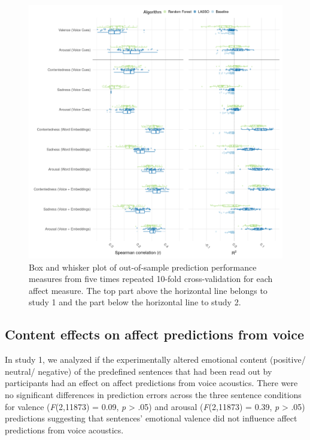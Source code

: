 \documentclass[
  english,
  man,floatsintext]{apa6}
\begin{document}
\begin{figure}

{\centering \includegraphics[width=1\linewidth,height=1\textheight]{../figures/bmr_plot} 

}

\caption[Prediction performance]{Box and whisker plot of out-of-sample prediction performance measures from five times repeated 10-fold cross-validation for each affect measure. The top part above the horizontal line belongs to study 1 and the part below the horizontal line to study 2.}\label{fig:predictionoverview}
\end{figure}
\newpage

\hypertarget{content-effects-on-affect-predictions-from-voice}{%
\subsection{Content effects on affect predictions from voice}\label{content-effects-on-affect-predictions-from-voice}}

In study 1, we analyzed if the experimentally altered emotional content (positive/ neutral/ negative) of the predefined sentences that had been read out by participants had an effect on affect predictions from voice acoustics. There were no significant differences in prediction errors across the three sentence conditions for valence (\emph{F}(2,11873) = 0.09,
\emph{p} \textgreater{} .05) and arousal (\emph{F}(2,11873) = 0.39,
\emph{p} \textgreater{} .05) predictions suggesting that sentences' emotional valence did not influence affect predictions from voice acoustics.
\end{document}
